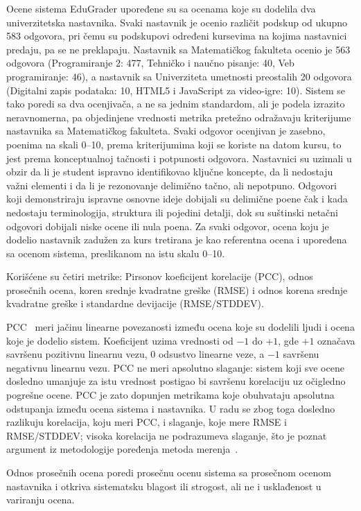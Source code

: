Ocene sistema EduGrader upoređene su sa ocenama koje su dodelila dva univerzitetska nastavnika.
Svaki nastavnik je ocenio različit podskup od ukupno 583 odgovora,
pri čemu su podskupovi određeni kursevima na kojima nastavnici predaju, pa se ne preklapaju.
Nastavnik sa Matematičkog fakulteta ocenio je 563 odgovora (Programiranje 2: 477, Tehničko i naučno pisanje: 40, Veb programiranje: 46),
a nastavnik sa Univerziteta umetnosti preostalih 20 odgovora (Digitalni zapis podataka: 10, HTML5 i JavaScript za video-igre: 10).
Sistem se tako poredi sa dva ocenjivača, a ne sa jednim standardom, ali je podela izrazito neravnomerna,
pa objedinjene vrednosti metrika pretežno odražavaju kriterijume nastavnika sa Matematičkog fakulteta.
Svaki odgovor ocenjivan je zasebno, poenima na skali 0--10,
prema kriterijumima koji se koriste na datom kursu, to jest prema konceptualnoj tačnosti i potpunosti odgovora.
Nastavnici su uzimali u obzir da li je student ispravno identifikovao ključne koncepte,
da li nedostaju važni elementi i da li je rezonovanje delimično tačno, ali nepotpuno.
Odgovori koji demonstriraju ispravne osnovne ideje dobijali su delimične poene čak i kada nedostaju terminologija, struktura ili pojedini detalji,
dok su suštinski netačni odgovori dobijali niske ocene ili nula poena.
Za svaki odgovor, ocena koju je dodelio nastavnik zadužen za kurs tretirana je kao referentna ocena i upoređena sa ocenom sistema,
preslikanom na istu skalu 0--10.

Korišćene su četiri metrike: Pirsonov koeficijent korelacije (PCC), odnos prosečnih ocena,
koren srednje kvadratne greške (RMSE) i odnos korena srednje kvadratne greške i standardne devijacije (RMSE/STDDEV).

PCC~\cite{sedgwick2012pearson} meri jačinu linearne povezanosti između ocena koje su dodelili ljudi i ocena koje je dodelio sistem.
Koeficijent uzima vrednosti od $-1$ do $+1$, gde $+1$ označava savršenu pozitivnu linearnu vezu,
$0$ odsustvo linearne veze, a $-1$ savršenu negativnu linearnu vezu.
PCC ne meri apsolutno slaganje: sistem koji sve ocene dosledno umanjuje za istu vrednost postigao bi savršenu korelaciju uz očigledno pogrešne ocene.
PCC je zato dopunjen metrikama koje obuhvataju apsolutna odstupanja između ocena sistema i nastavnika.
U radu se zbog toga dosledno razlikuju korelacija, koju meri PCC, i slaganje, koje mere RMSE i RMSE/STDDEV;
visoka korelacija ne podrazumeva slaganje, što je poznat argument iz metodologije poređenja metoda merenja~\cite{mansournia2021bland}.

Odnos prosečnih ocena poredi prosečnu ocenu sistema sa prosečnom ocenom nastavnika i otkriva sistematsku blagost ili strogost,
ali ne i usklađenost u variranju ocena.

